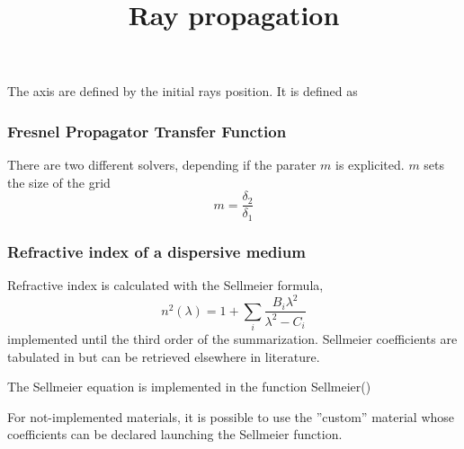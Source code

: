 \documentclass{article}
\begin{document}
\title{Ray propagation}
	
The axis are defined by the initial rays position. It is defined as 
\subsubsection{Fresnel Propagator Transfer Function}
There are two different solvers, depending if the parater $m$ is explicited. $m$ sets the size of the grid 
\begin{equation}
m=\frac{\delta_2}{\delta_1}
\end{equation}
	
\subsubsection{Refractive index of a dispersive medium}
Refractive index is calculated with the Sellmeier formula, 
\begin{equation}
n^2 \left( \lambda \right)  = 1 + \sum_{i} \frac{B_i \lambda^2}{\lambda^2 - C_i}
\end{equation}
implemented until the third order of the summarization. Sellmeier coefficients are tabulated in 
but can be retrieved elsewhere in literature.

The Sellmeier equation is implemented in the function Sellmeier()

For not-implemented materials, it is possible to use the ''custom'' material whose coefficients can be declared launching the Sellmeier function.
\end{document}
